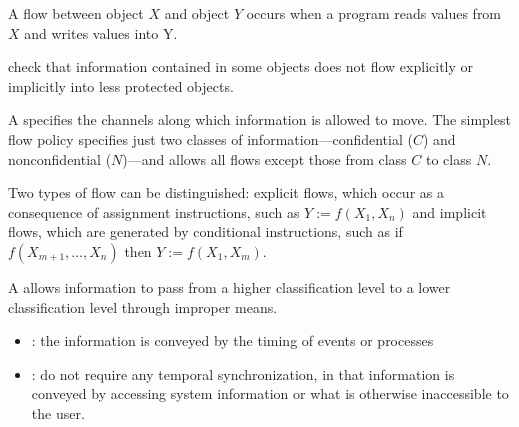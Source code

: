 
    \par A flow between object $X$ and object $Y$ occurs when a program reads values from $X$ and writes values into Y.
    \par {} check that information contained in some objects does not flow explicitly or implicitly into less protected objects.
    \par A  specifies the channels along which information is allowed to move. The simplest flow policy specifies just two classes of information—confidential ($C$) and nonconfidential ($N$)—and allows all flows except those from class $C$ to class $N$. 
    \par Two types of flow can be distinguished: explicit flows, which occur as a consequence of assignment instructions, such as $Y:= f(X_1, X_n)$ and implicit flows, which are generated by conditional instructions, such as if $f(X_{m+1}, \ldots , X_n)$ then $Y:= f(X_1, X_m)$.

    \par A  allows information to pass from a higher classification level to a lower classification level through improper means.
    \begin{itemize}
      \item {}: the information is conveyed by the timing of events or processes
      \item {}: do not require any temporal synchronization, in that information is conveyed by accessing system information or what is otherwise inaccessible to the user.
    \end{itemize}
